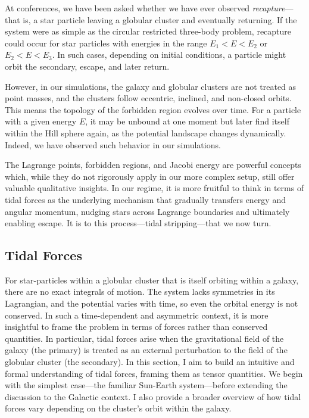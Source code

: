         At conferences, we have been asked whether we have ever observed \textit{recapture}—that is, a star particle leaving a globular cluster and eventually returning. If the system were as simple as the circular restricted three-body problem, recapture could occur for star particles with energies in the range \( E_1 < E < E_2 \) or \( E_2 < E < E_3 \). In such cases, depending on initial conditions, a particle might orbit the secondary, escape, and later return.

        However, in our simulations, the galaxy and globular clusters are not treated as point masses, and the clusters follow eccentric, inclined, and non-closed orbits. This means the topology of the forbidden region evolves over time. For a particle with a given energy \( E \), it may be unbound at one moment but later find itself within the Hill sphere again, as the potential landscape changes dynamically. Indeed, we have observed such behavior in our simulations.

        The Lagrange points, forbidden regions, and Jacobi energy are powerful concepts which, while they do not rigorously apply in our more complex setup, still offer valuable qualitative insights. In our regime, it is more fruitful to think in terms of tidal forces as the underlying mechanism that gradually transfers energy and angular momentum, nudging stars across Lagrange boundaries and ultimately enabling escape. It is to this process—tidal stripping—that we now turn.


    \subsection{Tidal Forces}
        For star-particles within a globular cluster that is itself orbiting within a galaxy, there are no exact integrals of motion. The system lacks symmetries in its Lagrangian, and the potential varies with time, so even the orbital energy is not conserved. In such a time-dependent and asymmetric context, it is more insightful to frame the problem in terms of forces rather than conserved quantities. In particular, tidal forces arise when the gravitational field of the galaxy (the primary) is treated as an external perturbation to the field of the globular cluster (the secondary). In this section, I aim to build an intuitive and formal understanding of tidal forces, framing them as tensor quantities. We begin with the simplest case—the familiar Sun-Earth system—before extending the discussion to the Galactic context. I also provide a broader overview of how tidal forces vary depending on the cluster's orbit within the galaxy.

